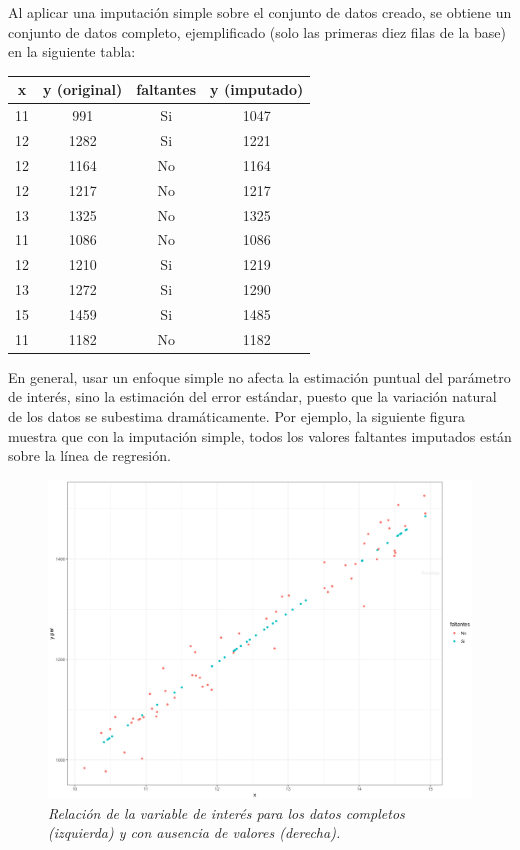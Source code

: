 \documentclass[
  10pt,
  spanish,
]{book}
\begin{document}
Al aplicar una imputación simple sobre el conjunto de datos creado, se obtiene un conjunto de datos completo, ejemplificado (solo las primeras diez filas de la base) en la siguiente tabla:

\begin{longtable}[]{@{}cccc@{}}
\toprule
x & y (original) & faltantes & y (imputado) \\
\midrule
\endhead
11 & 991 & Si & 1047 \\
12 & 1282 & Si & 1221 \\
12 & 1164 & No & 1164 \\
12 & 1217 & No & 1217 \\
13 & 1325 & No & 1325 \\
11 & 1086 & No & 1086 \\
12 & 1210 & Si & 1219 \\
13 & 1272 & Si & 1290 \\
15 & 1459 & Si & 1485 \\
11 & 1182 & No & 1182 \\
\bottomrule
\end{longtable}

En general, usar un enfoque simple no afecta la estimación puntual del parámetro de interés, sino la estimación del error estándar, puesto que la variación natural de los datos se subestima dramáticamente. Por ejemplo, la siguiente figura muestra que con la imputación simple, todos los valores faltantes imputados están sobre la línea de regresión.

\begin{figure}
\centering
\includegraphics{Pics/im2.png}
\caption{\emph{Relación de la variable de interés para los datos completos (izquierda) y con ausencia de valores (derecha).}}
\end{figure}
\end{document}
